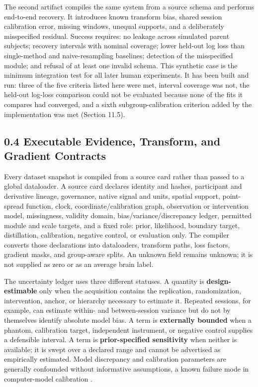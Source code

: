 The second artifact compiles the same system from a source schema and performs
end-to-end recovery. It introduces known transform bias, shared session
calibration error, missing windows, unequal supports, and a deliberately
misspecified residual. Success requires: no leakage across simulated parent
subjects; recovery intervals with nominal coverage; lower held-out log loss
than single-method and naive-resampling baselines; detection of the
misspecified module; and refusal of at least one invalid schema. This synthetic
case is the minimum integration test for all later human experiments. It has
been built and run: three of the five criteria listed here were met, interval
coverage was not, the held-out log-loss comparison could not be evaluated
because none of the fits it compares had converged, and a sixth
subgroup-calibration criterion added by the implementation was met
(Section 11.5).

\subsection{0.4 Executable Evidence, Transform, and Gradient Contracts}

Every dataset snapshot is compiled from a source card rather than passed to a
global dataloader. A source card declares identity and hashes, participant and
derivative lineage, governance, native signal and units, spatial support,
point-spread function, clock, coordinate/calibration graph, observation or
intervention model, missingness, validity domain, bias/variance/discrepancy
ledger, permitted module and scale targets, and a fixed role: prior,
likelihood, boundary target, distillation, calibration, negative control, or
evaluation only. The compiler converts those declarations into dataloaders,
transform paths, loss factors, gradient masks, and group-aware splits. An
unknown field remains unknown; it is not supplied as zero or as an average
brain label.

The uncertainty ledger uses three different statuses. A quantity is
\textbf{design-estimable} only when the acquisition contains the replication,
randomization, intervention, anchor, or hierarchy necessary to estimate it.
Repeated sessions, for example, can estimate within- and between-session
variance but do not by themselves identify absolute model bias. A term is
\textbf{externally bounded} when a phantom, calibration target, independent
instrument, or negative control supplies a defensible interval. A term is
\textbf{prior-specified sensitivity} when neither is available; it is swept
over a declared range and cannot be advertised as empirically estimated.
Model discrepancy and calibration parameters are generally confounded without
informative assumptions, a known failure mode in computer-model calibration
\citep{kennedy2001,brynjarsdottir2014}.

